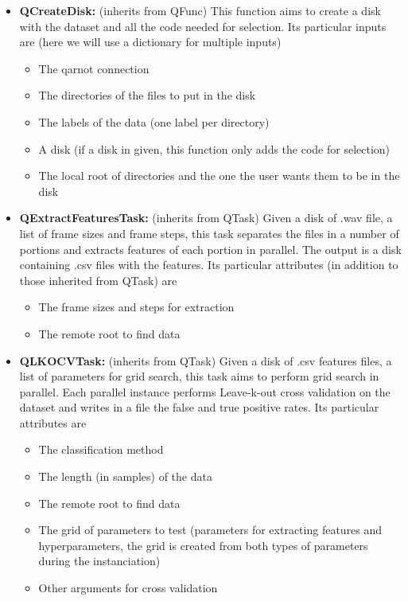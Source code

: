 \documentclass[10pt, conference, compsocconf]{IEEEtran}
\begin{document}
\begin{itemize}
\item \textbf{QCreateDisk:} (inherits from QFunc) This function aims to create a disk with the dataset and all the code needed for selection.
  Its particular inputs are (here we will use a dictionary for multiple inputs)
  \begin{itemize}
  \item The qarnot connection
  \item The directories of the files to put in the disk
  \item The labels of the data (one label per directory)
  \item A disk (if a disk in given, this function only adds the code for selection)
  \item The local root of directories and the one the user wants them to be in the disk
  \end{itemize}
\item \textbf{QExtractFeaturesTask:} (inherits from QTask) Given a disk of .wav file, a list of frame sizes and frame steps, this task separates the files in a number of portions and extracts features of each portion in parallel. The output is a disk containing .csv files with the features.
  Its particular attributes (in addition to those inherited from QTask) are
  \begin{itemize}
  \item The frame sizes and steps for extraction
  \item The remote root to find data
  \end{itemize}
\item \textbf{QLKOCVTask:} (inherits from QTask) Given a disk of .csv features files, a list of parameters for grid search, this task aims to perform grid search in parallel. Each parallel instance performs Leave-k-out cross validation on the dataset and writes in a file the false and true positive rates.
  Its particular attributes are
  \begin{itemize}
  \item The classification method
  \item The length (in samples) of the data
  \item The remote root to find data
  \item The grid of parameters to test (parameters for extracting features and hyperparameters, the grid is created from both types of parameters during the instanciation)
  \item Other arguments for cross validation

\end{itemize}
\end{itemize}
\end{document}

